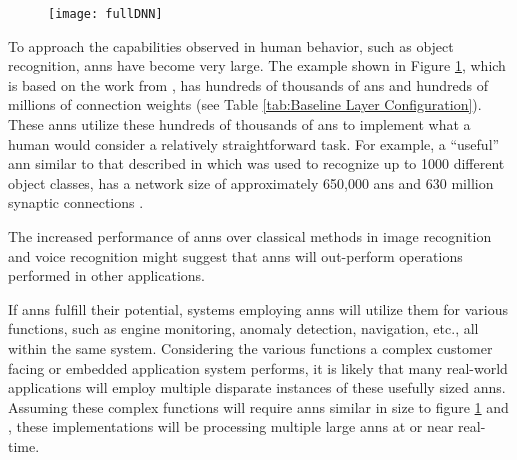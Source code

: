 \begin{landscape}
\begin{figure}[!htbp]
      \bigskip
  
        \begin{minipage}{0.95\linewidth}
          \centering
          \texttt{[image: fullDNN]}
          \captionsetup{justification=centering, skip=15pt}
          \label{fig:Baseline DNN showing layer order}
        \end{minipage}
    
  \end{figure}
\end{landscape}
\restoregeometry
{}
\pagestyle{plain}
\thispagestyle{plain}




\iffalse
\begin{sidewaysfigure}[h]
\centering
\texttt{[image: fullDNN]}
\captionsetup{justification=centering, skip=15pt}
\caption{DNN showing layer order \cite{krizhevsky2012imagenet}}
\label{fig:DNN showing layer order}
\end{sidewaysfigure}
\fi

To approach the capabilities observed in human behavior, such as object recognition, \ac{ann}s have become very large. 
The example shown in Figure \ref{fig:Baseline DNN showing layer order}, which is based on the work from \cite{krizhevsky2012imagenet}, has hundreds of thousands of \acp{an} and hundreds of millions of connection weights (see Table \ref{tab:Baseline Layer Configuration}).
These \acp{ann} utilize these hundreds of thousands of \acp{an} to implement what a human would consider a relatively straightforward task.
For example, a ``useful'' \ac{ann} similar to that described in \cite{krizhevsky2012imagenet} which was used to recognize up to 1000 different object classes, has a network size of approximately 650,000 \acp{an} and 630 million synaptic connections \cite{krizhevsky2012imagenetPreso}. 

The increased performance of \ac{ann}s over classical methods in image recognition and voice recognition might suggest that \ac{ann}s will out-perform operations performed in other applications.
\iffalse There is reason to believe that \acp{ann} will replace various functions in existing systems. \fi

If \acp{ann} fulfill their potential, systems employing \ac{ann}s will utilize them for various functions, such as engine monitoring, anomaly detection, navigation, etc., all within the same system.
Considering the various functions a complex customer facing or embedded application system performs, it is likely that many real-world applications will employ multiple disparate instances of these usefully sized \acp{ann}.
Assuming these complex functions will require \ac{ann}s similar in size to figure \ref{fig:Baseline DNN showing layer order} and \cite{krizhevsky2012imagenet}, these implementations will be processing multiple large \ac{ann}s at or near real-time.

